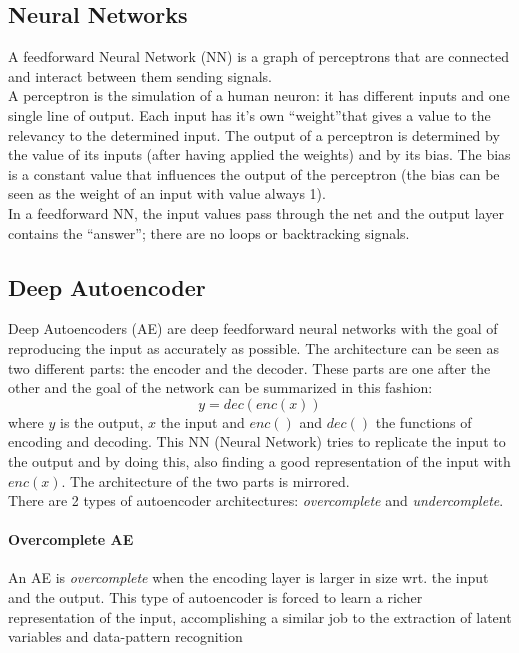 \documentclass{article}
\begin{document}
			\subsection{Neural Networks}
			A feedforward Neural Network (NN) is a graph of perceptrons that are connected and interact between them sending signals.\\
			A perceptron is the simulation of a human neuron: it has different inputs and one single line of output. Each input has it's own \textquotedblleft weight\textquotedblright that gives a value to the relevancy to the determined input. The output of a perceptron is determined by the value of its inputs (after having applied the weights) and by its bias. The bias is a constant value that influences the output of the perceptron (the bias can be seen as the weight of an input with value always 1).\\
			In a feedforward NN, the input values pass through the net and the output layer contains the \textquotedblleft answer\textquotedblright; there are no loops or backtracking signals.
			\begin{figure}[h!]
				\centerline{}
			\end{figure}
			
			\subsection{Deep Autoencoder}
			Deep Autoencoders (AE) are deep feedforward neural networks with the goal of reproducing the input as accurately as possible. The architecture can be seen as two different parts: the encoder and the decoder. These parts are one after the other and the goal of the network can be summarized in this fashion:
			$$y=dec(enc(x))$$
			where $y$ is the output, $x$ the input and $enc()$ and $dec()$ the functions of encoding and decoding. This NN (Neural Network) tries to replicate the input to the output and by doing this, also finding a good representation of the input with $enc(x)$. The architecture of the two parts is mirrored.\\
			There are 2 types of autoencoder architectures: \textit{overcomplete} and \textit{undercomplete}.
			\paragraph{Overcomplete AE}
			An AE is \textit{overcomplete} when the encoding layer is larger in size wrt. the input and the output. This type of autoencoder is forced to learn a richer representation of the input, accomplishing a similar job to the extraction of latent variables and data-pattern recognition
\end{document}
